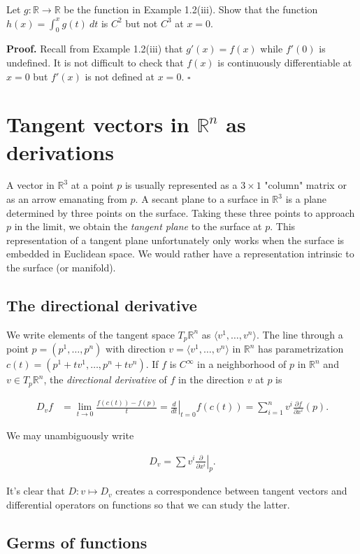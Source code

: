 \documentclass[a4paper]{article}
\newcommand{\R}{\mathbb{R}}
\begin{document}
Let $g : \R \to \R$ be the function in Example 1.2(iii). Show that the function $h(x) = \int_0^x g(t)\ dt$ is $C^2$ but not $C^3$ at $x = 0$.

\textbf{Proof.} Recall from Example 1.2(iii) that $g'(x) = f(x)$ while $f'(0)$ is undefined. It is not difficult to check that $f(x)$ is continuously differentiable at $x = 0$ but $f'(x)$ is not defined at $x = 0$. $\square$

\section{Tangent vectors in $\R^n$ as derivations}

A vector in $\R^3$ at a point $p$ is usually represented as a $3\times1$ "column" matrix or as an arrow emanating from $p$. A secant plane to a surface in $\R^3$ is a plane determined by three points on the surface. Taking these three points to approach $p$ in the limit, we obtain the \emph{tangent plane} to the surface at $p$. This representation of a tangent plane unfortunately only works when the surface is embedded in Euclidean space. We would rather have a representation intrinsic to the surface (or manifold).

\subsection{The directional derivative}

We write elements of the tangent space $T_p\R^n$ as $\langle v^1, \ldots, v^n \rangle$. The line through a point $p = (p^1, \ldots, p^n)$ with direction $v = \langle v^1, \ldots, v^n \rangle$ in $\R^n$ has parametrization $c(t) = (p^1 + tv^1, \ldots, p^n + tv^n)$. If $f$ is $C^\infty$ in a neighborhood of $p$ in $\R^n$ and $v \in T_p\R^n$, the \emph{directional derivative} of $f$ in the direction $v$ at $p$ is 

\begin{align}
    \displaystyle D_vf &= \lim_{t \to 0} \frac{f(c(t)) - f(p)}{t} = \left.\frac{d}{dt}\right|_{t=0} f(c(t)) = \sum_{i=1}^n v^i \frac{\partial f}{\partial x^i}(p).
\end{align}

We may unambiguously write

\begin{align}
    D_v = \sum v^i \left.\frac{\partial}{\partial x^i}\right|_p.
\end{align}

It's clear that $D : v \mapsto D_v$ creates a correspondence between tangent vectors and differential operators on functions so that we can study the latter.

\subsection{Germs of functions}
\end{document}
